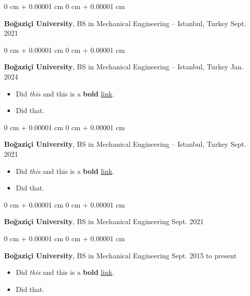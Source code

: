 \documentclass[10pt, letterpaper]{article}
\newenvironment{highlights}{
    \begin{itemize}[
        topsep=0.10 cm,
        parsep=0.10 cm,
        partopsep=0pt,
        itemsep=0pt,
        leftmargin=0 cm + 10pt
    ]
}{
    \end{itemize}
        
    \vspace{-0.20cm}
} %
\newenvironment{onecolentry}{
    \begin{adjustwidth}{
        0 cm + 0.00001 cm
    }{
        0 cm + 0.00001 cm
    }
}{
    \end{adjustwidth}
} %
\begin{document}
        \vspace{0.1 cm}

        \begin{onecolentry}
            \textbf{Boğaziçi University}, BS in Mechanical Engineering -- Istanbul, Turkey \hfill Sept. 2021
        \end{onecolentry}

        \vspace{0.1 cm}

        \begin{onecolentry}
            \textbf{Boğaziçi University}, BS in Mechanical Engineering -- Istanbul, Turkey \hfill Jan. 2024
            \begin{highlights}
                \item Did \textit{this} and this is a \textbf{bold} \href{https://example.com}{link}.
                \item Did that.
            \end{highlights}
        \end{onecolentry}

        \vspace{0.1 cm}

        \begin{onecolentry}
            \textbf{Boğaziçi University}, BS in Mechanical Engineering -- Istanbul, Turkey \hfill Sept. 2021
            \begin{highlights}
                \item Did \textit{this} and this is a \textbf{bold} \href{https://example.com}{link}.
                \item Did that.
            \end{highlights}
        \end{onecolentry}

        \vspace{0.1 cm}

        \begin{onecolentry}
            \textbf{Boğaziçi University}, BS in Mechanical Engineering \hfill Sept. 2021
        \end{onecolentry}

        \vspace{0.1 cm}

        \begin{onecolentry}
            \textbf{Boğaziçi University}, BS in Mechanical Engineering \hfill Sept. 2015 to present
            \begin{highlights}
                \item Did \textit{this} and this is a \textbf{bold} \href{https://example.com}{link}.
                \item Did that.
            \end{highlights}
        \end{onecolentry}
\end{document}
